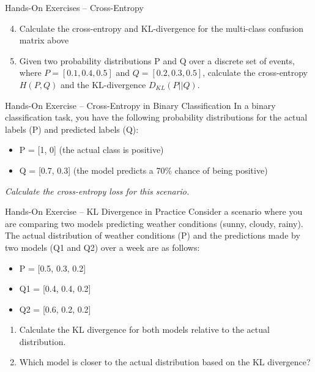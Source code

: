 \documentclass[ignorenonframetext,xcolor=x11names]{beamer}
\begin{document}
\begin{frame}{Hands-On Exercises -- Cross-Entropy}
\begin{enumerate}
  \setcounter{enumi}{3}
  \item Calculate the cross-entropy and KL-divergence for the multi-class confusion matrix above
  \item Given two probability distributions P and Q over a discrete set of events, where $P = [0.1, 0.4, 0.5]$ and $Q = [0.2, 0.3, 0.5]$, calculate the cross-entropy $H(P, Q)$ and the KL-divergence $D_{KL}(P || Q)$.
\end{enumerate}
\end{frame}

\begin{frame}{Hands-On Exercise -- Cross-Entropy in Binary Classification}
In a binary classification task, you have the following probability distributions for the actual labels (P) and predicted labels (Q):
\begin{itemize}
  \item P = [1, 0] (the actual class is positive)
  \item Q = [0.7, 0.3] (the model predicts a 70\% chance of being positive)
\end{itemize}
\vspace{\baselineskip}
\emph{Calculate the cross-entropy loss for this scenario.}
\end{frame}


\begin{frame}{Hands-On Exercise -- KL Divergence in Practice}
Consider a scenario where you are comparing two models predicting weather conditions (sunny, cloudy, rainy). The actual distribution of weather conditions (P) and the predictions made by two models (Q1 and Q2) over a week are as follows:
\begin{itemize}
  \item P = [0.5, 0.3, 0.2]
  \item Q1 = [0.4, 0.4, 0.2]
  \item Q2 = [0.6, 0.2, 0.2]
\end{itemize}
\vspace{\baselineskip}
\begin{enumerate}
  \item Calculate the KL divergence for both models relative to the actual distribution.
  \item Which model is closer to the actual distribution based on the KL divergence?
\end{enumerate}
\end{frame}
\end{document}
